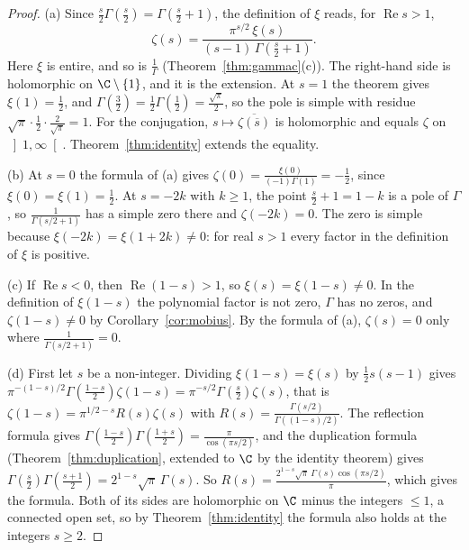 \begin{proof}
(a) Since $\frac s2\Gamma(\frac s2)=\Gamma(\frac s2+1)$, the definition of $\xi$ reads, for $\operatorname{Re}s>1$,
\[
\zeta(s)=\frac{\pi^{s/2}\,\xi(s)}{(s-1)\,\Gamma(\frac s2+1)}.
\]
Here $\xi$ is entire, and so is $\frac1\Gamma$ (Theorem~\ref{thm:gammac}(c)). The right-hand side is holomorphic on $\C\setminus\{1\}$, and it is the extension. At $s=1$ the theorem gives $\xi(1)=\frac12$, and $\Gamma(\frac32)=\frac12\Gamma(\frac12)=\frac{\sqrt\pi}2$, so the pole is simple with residue $\sqrt\pi\cdot\frac12\cdot\frac2{\sqrt\pi}=1$. For the conjugation, $s\mapsto\overline{\zeta(\overline s)}$ is holomorphic and equals $\zeta$ on $\left]1,\infty\right[$. Theorem~\ref{thm:identity} extends the equality.

(b) At $s=0$ the formula of (a) gives $\zeta(0)=\frac{\xi(0)}{(-1)\Gamma(1)}=-\frac12$, since $\xi(0)=\xi(1)=\frac12$. At $s=-2k$ with $k\ge1$, the point $\frac s2+1=1-k$ is a pole of $\Gamma$, so $\frac1{\Gamma(s/2+1)}$ has a simple zero there and $\zeta(-2k)=0$. The zero is simple because $\xi(-2k)=\xi(1+2k)\ne0$: for real $s>1$ every factor in the definition of $\xi$ is positive.

(c) If $\operatorname{Re}s<0$, then $\operatorname{Re}(1-s)>1$, so $\xi(s)=\xi(1-s)\ne0$. In the definition of $\xi(1-s)$ the polynomial factor is not zero, $\Gamma$ has no zeros, and $\zeta(1-s)\ne0$ by Corollary~\ref{cor:mobius}. By the formula of (a), $\zeta(s)=0$ only where $\frac1{\Gamma(s/2+1)}=0$.

(d) First let $s$ be a non-integer. Dividing $\xi(1-s)=\xi(s)$ by $\frac12 s(s-1)$ gives $\pi^{-(1-s)/2}\Gamma(\frac{1-s}2)\zeta(1-s)=\pi^{-s/2}\Gamma(\frac s2)\zeta(s)$, that is $\zeta(1-s)=\pi^{1/2-s}R(s)\zeta(s)$ with $R(s)=\frac{\Gamma(s/2)}{\Gamma((1-s)/2)}$. The reflection formula gives $\Gamma(\frac{1-s}2)\Gamma(\frac{1+s}2)=\frac\pi{\cos(\pi s/2)}$, and
the duplication formula (Theorem~\ref{thm:duplication}, extended to $\C$ by the identity theorem) gives $\Gamma(\frac s2)\Gamma(\frac{s+1}2)=2^{1-s}\sqrt\pi\,\Gamma(s)$. So
$R(s)=\frac{2^{1-s}\sqrt\pi\,\Gamma(s)\cos(\pi s/2)}\pi$, which gives the formula. Both of its sides are holomorphic on $\C$ minus the integers $\le1$, a connected open set, so by Theorem~\ref{thm:identity} the formula also holds at the integers $s\ge2$.
\end{proof}

